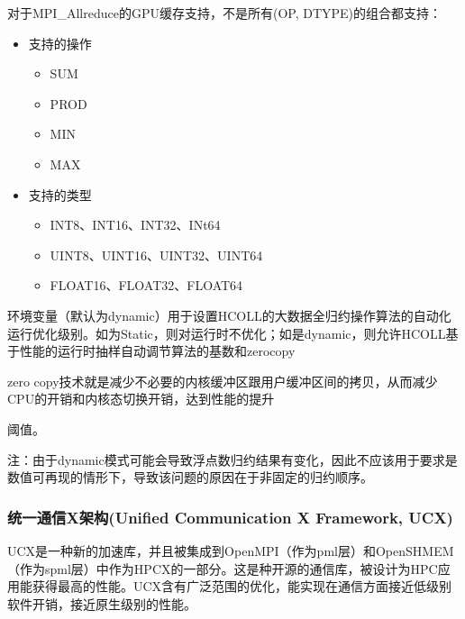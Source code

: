 \documentclass[a4paper,12pt,english]{sphinxmanual}
\begin{document}
\sphinxAtStartPar
{}

\sphinxAtStartPar
对于MPI\_Allreduce的GPU缓存支持，不是所有(OP, DTYPE)的组合都支持：
\begin{itemize}
\item {} 
\sphinxAtStartPar
支持的操作
\begin{itemize}
\item {} 
\sphinxAtStartPar
SUM

\item {} 
\sphinxAtStartPar
PROD

\item {} 
\sphinxAtStartPar
MIN

\item {} 
\sphinxAtStartPar
MAX

\end{itemize}

\item {} 
\sphinxAtStartPar
支持的类型
\begin{itemize}
\item {} 
\sphinxAtStartPar
INT8、INT16、INT32、INt64

\item {} 
\sphinxAtStartPar
UINT8、UINT16、UINT32、UINT64

\item {} 
\sphinxAtStartPar
FLOAT16、FLOAT32、FLOAT64

\end{itemize}

\end{itemize}
\label{\detokenize{mpi-application/mpi-application:id3}}
\sphinxAtStartPar
{}

\sphinxAtStartPar
环境变量（默认为dynamic）用于设置HCOLL的大数据全归约操作算法的自动化运行优化级别。如为Static，则对运行时不优化；如是dynamic，则允许HCOLL基于性能的运行时抽样自动调节算法的基数和zero\sphinxhyphen{}copy %
\begin{footnote}[1]\sphinxAtStartFootnote
zero copy技术就是减少不必要的内核缓冲区跟用户缓冲区间的拷贝，从而减少CPU的开销和内核态切换开销，达到性能的提升
%
\end{footnote} 阈值。

\sphinxAtStartPar
注：由于dynamic模式可能会导致浮点数归约结果有变化，因此不应该用于要求是数值可再现的情形下，导致该问题的原因在于非固定的归约顺序。


\subsubsection{统一通信\sphinxhyphen{}X架构(Unified Communication \sphinxhyphen{} X Framework, UCX)}
\label{\detokenize{mpi-application/mpi-application:x-unified-communication-x-framework-ucx}}
\sphinxAtStartPar
UCX是一种新的加速库，并且被集成到OpenMPI（作为pml层）和OpenSHMEM（作为spml层）中作为HPC\sphinxhyphen{}X的一部分。这是种开源的通信库，被设计为HPC应用能获得最高的性能。UCX含有广泛范围的优化，能实现在通信方面接近低级别软件开销，接近原生级别的性能。
\end{document}
